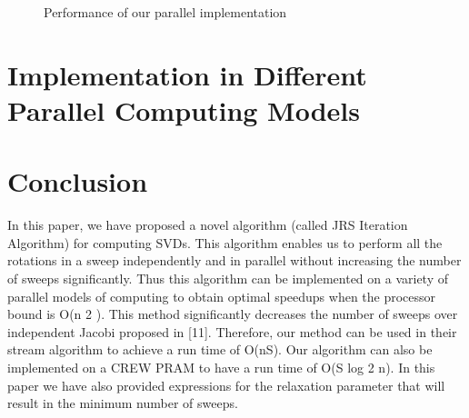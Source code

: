 \documentclass[10pt, conference, compsocconf]{IEEEtran}
\begin{document}
\begin{figure}[!htb]
\centering
{} \hfill
{}
\caption{Performance of our parallel implementation}
\end{figure}

\section{Implementation in Different Parallel Computing Models}
\label{sec:other}


\section{Conclusion}
\label{sec:conclude}

In this paper, we have proposed a novel algorithm (called
JRS Iteration Algorithm) for computing SVDs. This algorithm
enables us to perform all the rotations in a sweep independently
and in parallel without increasing the number of sweeps
significantly. Thus this algorithm can be implemented on a
variety of parallel models of computing to obtain optimal
speedups when the processor bound is O(n 2 ). This method
significantly decreases the number of sweeps over independent
Jacobi proposed in [11]. Therefore, our method can be used
in their stream algorithm to achieve a run time of O(nS). Our
algorithm can also be implemented on a CREW PRAM to have
a run time of O(S log 2 n). In this paper we have also provided
expressions for the relaxation parameter that will result in the
minimum number of sweeps.
\end{document}
